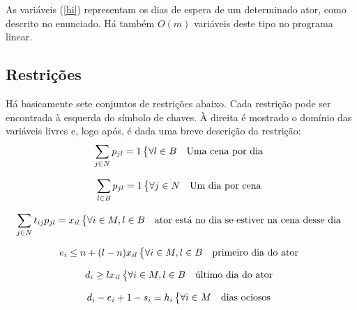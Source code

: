 \documentclass[a4paper,11pt]{article}
\begin{document}
As variáveis (\ref{hi}) representam os dias de espera de um determinado ator, como
descrito no enunciado. Há também $O(m)$ variáveis deste tipo no programa linear.
\subsection{Restrições}
Há basicamente sete conjuntos de restrições abaixo. Cada restrição pode ser encontrada
à esquerda do símbolo de chaves. À direita é mostrado o domínio das variáveis livres
e, logo após, é dada uma breve descrição da restrição:
\begin{equation}
  \sum_{j \in N} p_{jl} = 1 \begin{dcases*} \forall l \in B & Uma cena por dia \end{dcases*}
  \label{cena_dia}
\end{equation}

\begin{equation}
  \sum_{l \in B} p_{jl} = 1 \begin{dcases*} \forall j \in N & Um dia por cena \end{dcases*}
  \label{dia_cena}
\end{equation}

\begin{equation}
  \sum_{j \in N} t_{ij} p_{jl} = x_{il} \begin{dcases*} \forall i \in M, l \in B & ator está no dia se estiver na cena desse dia \end{dcases*}
  \label{actor_cene_day}
\end{equation}

\begin{equation}
  e_{i} \leq n + (l-n)x_{il} \begin{dcases*} \forall i \in M, l \in B & primeiro dia do ator \end{dcases*}
  \label{first_day}
\end{equation}

\begin{equation}
  d_{i} \geq lx_{il} \begin{dcases*} \forall i \in M, l \in B & último dia do ator \end{dcases*}
  \label{last_day}
\end{equation}

\begin{equation}
  d_{i} - e_i + 1 - s_i = h_i \begin{dcases*} \forall i \in M & dias ociosos \end{dcases*}
  \label{wait}
\end{equation}
\end{document}
